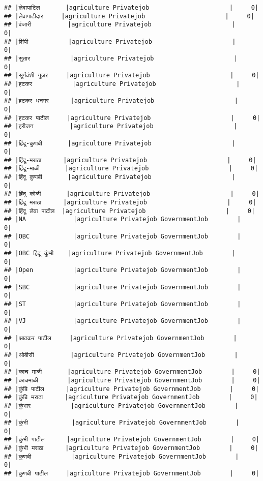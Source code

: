 \documentclass[
]{article}
\begin{document}
\begin{verbatim}
## |लेवापाटिल       |agriculture Privatejob                      |     0|
## |लेवापाटीदार     |agriculture Privatejob                      |     0|
## |वंजारी          |agriculture Privatejob                      |     0|
## |शिंपी           |agriculture Privatejob                      |     0|
## |सुतार           |agriculture Privatejob                      |     0|
## |सूर्यवंशी गुजर     |agriculture Privatejob                      |     0|
## |हटकर           |agriculture Privatejob                      |     0|
## |हटकर धनगर      |agriculture Privatejob                      |     0|
## |हटकर पाटील     |agriculture Privatejob                      |     0|
## |हरीजन          |agriculture Privatejob                      |     0|
## |हिंदू-कुणबी       |agriculture Privatejob                      |     0|
## |हिंदू-मराठा      |agriculture Privatejob                      |     0|
## |हिंदू-माळी       |agriculture Privatejob                      |     0|
## |हिंदू कुणबी       |agriculture Privatejob                      |     0|
## |हिंदू कोळी       |agriculture Privatejob                      |     0|
## |हिंदू मराठा      |agriculture Privatejob                      |     0|
## |हिंदू लेवा पाटील  |agriculture Privatejob                      |     0|
## |NA             |agriculture Privatejob GovernmentJob        |     0|
## |OBC            |agriculture Privatejob GovernmentJob        |     0|
## |OBC हिंदू कुंभी    |agriculture Privatejob GovernmentJob        |     0|
## |Open           |agriculture Privatejob GovernmentJob        |     0|
## |SBC            |agriculture Privatejob GovernmentJob        |     0|
## |ST             |agriculture Privatejob GovernmentJob        |     0|
## |VJ             |agriculture Privatejob GovernmentJob        |     0|
## |आठकर पाटील     |agriculture Privatejob GovernmentJob        |     0|
## |ओबीसी          |agriculture Privatejob GovernmentJob        |     0|
## |काच माळी       |agriculture Privatejob GovernmentJob        |     0|
## |काचमाळी        |agriculture Privatejob GovernmentJob        |     0|
## |कुंबि पाटील      |agriculture Privatejob GovernmentJob        |     0|
## |कुंबि मराठा      |agriculture Privatejob GovernmentJob        |     0|
## |कुंभार           |agriculture Privatejob GovernmentJob        |     0|
## |कुंभी            |agriculture Privatejob GovernmentJob        |     0|
## |कुंभी पाटील      |agriculture Privatejob GovernmentJob        |     0|
## |कुंभी मराठा      |agriculture Privatejob GovernmentJob        |     0|
## |कुणबी           |agriculture Privatejob GovernmentJob        |     0|
## |कुणबी पाटील     |agriculture Privatejob GovernmentJob        |     0|

\end{verbatim}
\end{document}
